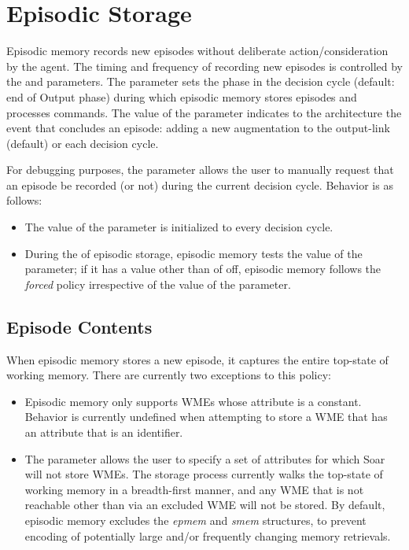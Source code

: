 \section{Episodic Storage}
\label{EPMEM-storage}

Episodic memory records new episodes without deliberate action/consideration by the agent. 
The timing and frequency of recording new episodes is controlled by the  and  parameters.  
The  parameter sets the phase in the decision cycle (default: end of Output phase) during which episodic memory stores episodes and processes commands.  
The value of the  parameter indicates to the architecture the event that concludes an episode: adding a new augmentation to the output-link (default) or each decision cycle.

For debugging purposes, the  parameter allows the user to manually request that an episode be recorded (or not) during the current decision cycle.  
Behavior is as follows:

\begin{itemize}
\item 
The value of the  parameter is initialized to  every decision cycle.

\item 
During the  of episodic storage, episodic memory tests the value of the  parameter; if it has a value other than of off, episodic memory follows the \emph{forced} policy irrespective of the value of the  parameter.

\end{itemize}

\subsection{Episode Contents}
When episodic memory stores a new episode, it captures the entire top-state of working memory. 
There are currently two exceptions to this policy:

\begin{itemize}
\item 
Episodic memory only supports WMEs whose attribute is a constant. 
Behavior is currently undefined when attempting to store a WME that has an attribute that is an identifier.

\item 
The  parameter allows the user to specify a set of attributes for which Soar will not store WMEs. 
The storage process currently walks the top-state of working memory in a breadth-first manner, and any WME that is not reachable other than via an excluded WME will not be stored. 
By default, episodic memory excludes the \emph{epmem} and \emph{smem} structures, to prevent encoding of potentially large and/or frequently changing memory retrievals.

\end{itemize}

